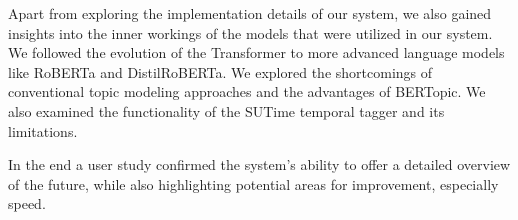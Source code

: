 \documentclass[12pt,oneside,bibtotoc,liststotoc]{scrbook}
\begin{document}
Apart from exploring the implementation details of our system, we also gained insights into the inner workings of the models that were utilized in our system. We followed the evolution of the Transformer to more advanced language models like RoBERTa and DistilRoBERTa. We explored the shortcomings of conventional topic modeling approaches and the advantages of BERTopic. We also examined the functionality of the SUTime temporal tagger and its limitations.

In the end a user study confirmed the system's ability to offer a detailed overview of the future, while also highlighting potential areas for improvement, especially speed.



\end{document}
